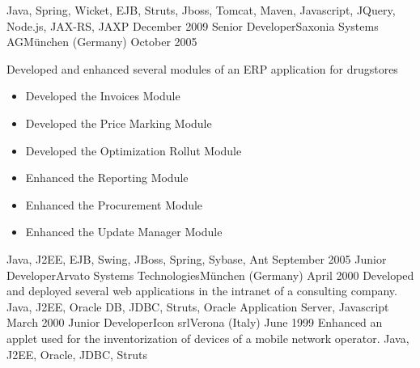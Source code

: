 \begin{experiences}
{                    }
                    {Java, Spring, Wicket, EJB, Struts, Jboss, Tomcat, Maven, Javascript, JQuery, Node.js, JAX-RS, JAXP}
  \emptySeparator
  \experience
  {December 2009}   {Senior Developer}{Saxonia Systems AG}{München (Germany)}
  {October 2005}    {
  					    Developed and enhanced several modules of an ERP application for drugstores
  					    \begin{itemize}
                        	\item Developed the Invoices Module
							\item Developed the Price Marking Module
							\item Developed the Optimization Rollut Module
                        	\item Enhanced the Reporting Module
                        	\item Enhanced the Procurement Module
    						\item Enhanced the Update Manager Module
                    	\end{itemize}
  					 }
                    {Java, J2EE, EJB, Swing, JBoss, Spring, Sybase, Ant}
  \emptySeparator
  \consultantexperience
  {September 2005}   {Junior Developer}{Arvato Systems Technologies}{München (Germany)}
  {April 2000}       {
                     	  Developed and deployed several web applications in the intranet of a consulting company.
                     }
                     {Java, J2EE, Oracle DB, JDBC, Struts, Oracle Application Server, Javascript}
  \emptySeparator
  \consultantexperience
  {March 2000}  	{Junior Developer}{Icon srl}{Verona (Italy)}
  {June 1999}   	{ 
  				 		Enhanced an applet used for the inventorization of devices of a mobile network operator.
  				 	}
                	{Java, J2EE, Oracle, JDBC, Struts} 
\end{experiences}

